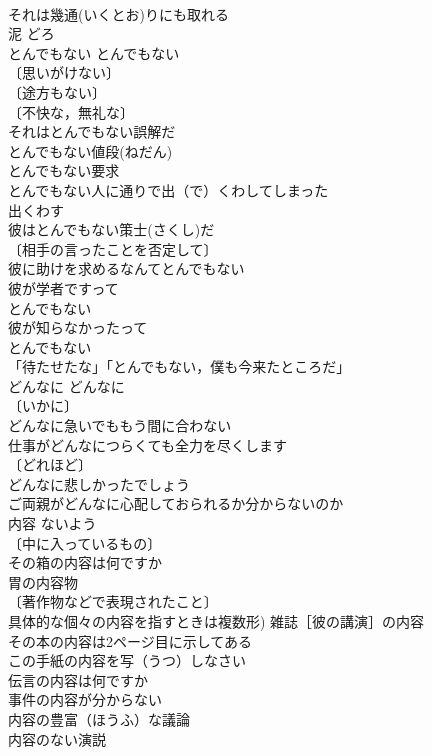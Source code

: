 \documentclass[8pt]{extreport}
\begin{document}
\begin{CJK}{UTF8}{min}
\\	それは幾通(いくとお)りにも取れる 
\\	泥	どろ	
\\	とんでもない	とんでもない	
\\	〔思いがけない〕
\\	〔途方もない〕
\\	〔不快な，無礼な〕
\\	それはとんでもない誤解だ 
\\	とんでもない値段(ねだん) 
\\	とんでもない要求 
\\	とんでもない人に通りで出（で）くわしてしまった 
\\	出くわす　
\\	彼はとんでもない策士(さくし)だ 
\\	〔相手の言ったことを否定して〕　
\\	彼に助けを求めるなんてとんでもない 
\\	彼が学者ですって
\\	とんでもない 
\\	彼が知らなかったって
\\	とんでもない 
\\	「待たせたな」「とんでもない，僕も今来たところだ」 
\\	どんなに	どんなに	
\\	〔いかに〕
\\	どんなに急いでももう間に合わない 
\\	仕事がどんなにつらくても全力を尽くします 
\\	〔どれほど〕
\\	どんなに悲しかったでしょう 
\\	ご両親がどんなに心配しておられるか分からないのか 
\\	内容	ないよう	
\\	〔中に入っているもの〕
\\	その箱の内容は何ですか 
\\	胃の内容物 
\\	〔著作物などで表現されたこと〕
\\	具体的な個々の内容を指すときは複数形) 雑誌［彼の講演］の内容 
\\	その本の内容は2ページ目に示してある 
\\	この手紙の内容を写（うつ）しなさい 
\\	伝言の内容は何ですか 
\\	事件の内容が分からない 
\\	内容の豊富（ほうふ）な議論 
\\	内容のない演説 

\end{CJK}
\end{document}
